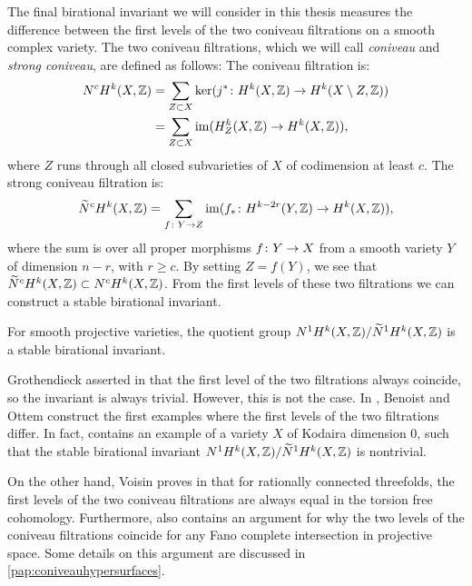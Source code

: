 The final birational invariant we will consider in this thesis measures the difference between the first levels of the two coniveau filtrations on a smooth complex variety. The two coniveau filtrations, which we will call \emph{coniveau} and \emph{strong coniveau}, are defined as follows: The coniveau filtration is:
\[
\begin{split}
	N^c H^k(X,\mathbb{Z}) &= \sum_{Z \subset X} \ker (j^* \colon H^k(X,\mathbb{Z}) \to H^k(X \setminus Z,\mathbb{Z})) \\
	&= \sum_{Z \subset X} \operatorname{im}(H^k_Z(X,\mathbb{Z}) \to H^k(X,\mathbb{Z})),
\end{split}
\]
where $Z$ runs through all closed subvarieties of $X$ of codimension at least $c$.
The strong coniveau filtration is:
\[\widetilde{N}^c H^k(X,\mathbb{Z}) = \sum_{f \colon Y \to Z} \operatorname{im}(f_*\colon H^{k-2r}(Y,\mathbb{Z}) \to H^k(X,\mathbb{Z})),\]
where the sum is over all proper morphisms $f \colon Y \to X$ from a smooth variety $Y$ of dimension $n-r$, with $r \geq c$. By setting $Z = f(Y)$, we see that $\widetilde{N}^c H^k(X,\mathbb{Z}) \subset N^c H^k(X,\mathbb{Z})$. From the first levels of these two filtrations we can construct a stable birational invariant.
\begin{proposition}
	For smooth projective varieties, the quotient group $N^1H^k(X,\mathbb{Z}) / \widetilde{N}^1H^k(X,\mathbb{Z})$ is a stable birational invariant.
\end{proposition}

Grothendieck asserted in \cite{GrothendieckBrauerIII} that the first level of the two filtrations always coincide, so the invariant is always trivial. However, this is not the case. In \cite{BenoistOttemConiveau}, Benoist and Ottem construct the first examples where the first levels of the two filtrations differ. In fact, \cite{BenoistOttemConiveau} contains an example of a variety $X$ of Kodaira dimension 0, such that the stable birational invariant $N^1H^k(X,\mathbb{Z}) / \widetilde{N}^1H^k(X,\mathbb{Z})$ is nontrivial.

On the other hand, Voisin proves in \cite{VoisinConiveauThreefolds} that for rationally connected threefolds, the first levels of the two coniveau filtrations are always equal in the torsion free cohomology. Furthermore, \cite{VoisinConiveauThreefolds} also contains an argument for why the two levels of the coniveau filtrations coincide for any Fano complete intersection in projective space. Some details on this argument are discussed in \cref{pap:coniveauhypersurfaces}.


